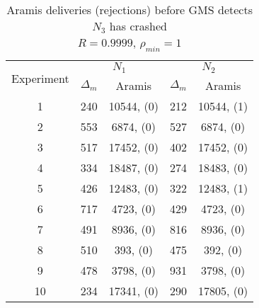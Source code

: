 \begin{table}[p]
    \begin{center}
        \renewcommand{\arraystretch}{1.25}
        \begin{tabular}{|c|c|c|c|c|}
            \hline
            \multirow{2}{*}{Experiment} & \multicolumn{2}{|c|}{$N_1$} & \multicolumn{2}{|c|}{$N_2$} \\ \cline{2-5}
                                                       & $\Delta_m$&\textsf{Aramis} & $\Delta_m$&\textsf{Aramis} \\ \hline \hline
            1 & 240 & 10544, (0) & 212 & 10544, (1) \\ \hline
            2 & 553 & 6874, (0) & 527 & 6874, (0) \\ \hline
            3 & 517 & 17452, (0) & 402 & 17452, (0) \\ \hline
            4 & 334 & 18487, (0) & 274 & 18483, (0) \\ \hline
            5 & 426 & 12483, (0) & 322 & 12483, (1) \\ \hline
            6 & 717 & 4723, (0) & 429 & 4723, (0) \\ \hline
            7 & 491 & 8936, (0) & 816 & 8936, (0) \\ \hline
            8 & 510 & 393, (0) & 475 & 392, (0) \\ \hline
            9 & 478 & 3798, (0) & 931 & 3798, (0) \\ \hline
            10 & 234 & 17341, (0) & 290 & 17805, (0) \\  \hline
        \end{tabular}
        \caption{\textsf{Aramis} deliveries (rejections) before GMS detects $N_3$ has crashed \\ $R=0.9999$, $\rho_{min}=1$}
        \label{table:crashed_node_rho1}
    \end{center}
\end{table}

